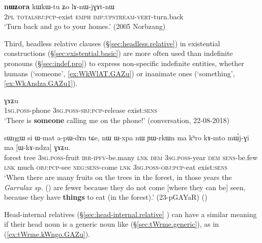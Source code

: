 \begin{exe}
\ex \label{ex:nWZora.kWkWtu}
\gll  \textbf{nɯʑora} kɯ\redp{}kɯ-tu ʑo lɤ-nɯ-jɣɤt-nɯ \\
\textsc{2pl} \textsc{total}\redp{}\textsc{sbj}:\textsc{pcp}-exist \textsc{emph} \textsc{imp}:\textsc{upstream}-\textsc{vert}-turn.back \\
\glt `Turn back and go to your homes.' (2005 Norbzang)
\end{exe}

Third, headless relative clauses (§\ref{sec:headless.relative}) in existential constructions (§\ref{sec:existential.basic}) are more often used than indefinite pronouns (§\ref{sec:indef.pro}) to express non-specific indefinite entities, whether humans (`someone', \ref{ex:WkWlAT.GAZu}) or inanimate ones  (`something', \ref{ex:WkAndza.GAZu1}).

\begin{exe}
\ex \label{ex:WkWlAT.GAZu}
 ɣɤʑu \\
 \textsc{1sg}.\textsc{poss}-phone \textsc{3sg}.\textsc{poss}-\textsc{sbj}:\textsc{pcp}-release exist:\textsc{sens} \\
\glt `There is \textbf{someone} calling me on the phone!' (conversation, 22-08-2018)
\end{exe}

\begin{exe}
\ex \label{ex:WkAndza.GAZu1}
\gll sɯŋgɯ si ɯ-mat a-pɯ-dɤn tɕe, nɯ ɯ-xpa nɯ ɲɯ-rkɯn ma kʰro kɤ-mto mɯ́j-ɣi ma [ɯ-kɤ-ndza] ɣɤʑu. \\
forest tree \textsc{3sg}.\textsc{poss}-fruit \textsc{irr}-\textsc{ipfv}-be.many \textsc{lnk} \textsc{dem} \textsc{3sg}.\textsc{poss}-year \textsc{dem} \textsc{sens}-be.few \textsc{lnk} much \textsc{obj}:\textsc{pcp}-see \textsc{neg}:\textsc{sens}-come \textsc{lnk} \textsc{3sg}.\textsc{poss}-\textsc{obj}:\textsc{pcp}-eat exist:\textsc{sens} \\
\glt `When there are many fruits on the trees in the forest, in those years the \textit{Garrulax sp.} () are fewer because they do not come [where they can be] seen, because they have \textbf{things} to eat (in the forest).' (23-pGAYaR)
()
\end{exe}

Head-internal relatives (§\ref{sec:head-internal.relative} ) can have a similar meaning if their head noun is a generic noun like  (§\ref{sec:tWrme.generic}), as in (\ref{ex:tWrme.kWngo.GAZu}).

